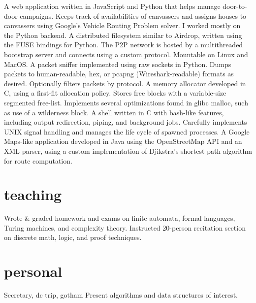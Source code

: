 \documentclass{cv}
\begin{document}
\begin{entrylist}
    {A web application written in JavaScript and Python that helps manage door-to-door campaigns. Keeps track of availabilities of canvassers and assigns houses to canvassers using Google's Vehicle Routing Problem solver. I worked mostly on the Python backend.}
    {A distributed filesystem similar to Airdrop, written using the FUSE bindings for Python. The P2P network is hosted by a multithreaded bootstrap server and connects using a custom protocol. Mountable on Linux and MacOS.}
    {A packet sniffer implemented using raw sockets in Python. Dumps packets to human-readable, hex, or pcapng (Wireshark-readable) formats as desired. Optionally filters packets by protocol.}
    {A memory allocator developed in C, using a first-fit allocation policy. Stores free blocks with a variable-size segmented free-list. Implements several optimizations found in glibc malloc, such as use of a wilderness block.}
    {A shell written in C with bash-like features, including output redirection, piping, and background jobs. Carefully implements UNIX signal handling and manages the life cycle of spawned processes.}
    {A Google Maps-like application developed in Java using the OpenStreetMap API and an XML parser, using a custom implementation of Djikstra's shortest-path algorithm for route computation.}
\end{entrylist}

\section{teaching}

\begin{entrylist}
    {Wrote \& graded homework and exams on finite automata, formal languages, Turing machines, and complexity theory.}
    {Instructed 20-person recitation section on discrete math, logic, and proof techniques.}
\end{entrylist}

\section{personal}

\begin{entrylist}
  {Secretary, dc trip, gotham
  }
  {Present algorithms and data structures of interest.
  } 
\end{entrylist}
\end{document}
